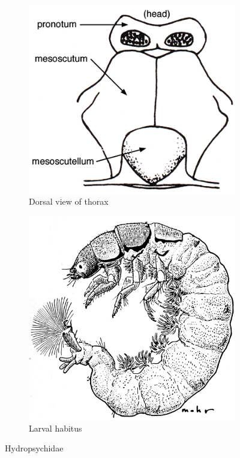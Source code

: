 \documentclass[letterpaper, 11pt]{article}
\begin{document}
\begin{figure}[ht!]
    \centering
    \begin{subfigure}[ht!]{0.36\textwidth}
        \includegraphics[width=\textwidth]{TrichoImage03}
        \caption{Dorsal view of thorax \citep[][Fig. 80]{bhl50956}}
        \label{fig:hydropsychid1}
    \end{subfigure}
    \hfill %
    \begin{subfigure}[ht!]{0.4\textwidth}
        \includegraphics[width=\textwidth]{HydropsychidLarva}%
        \caption{Larval habitus \citep[][Fig. 281]{bhl50956}}
        \label{fig:hydropsychid2}
    \end{subfigure}
    \caption{Hydropsychidae}\label{fig:hydropsychids}
\end{figure}
\end{document}
